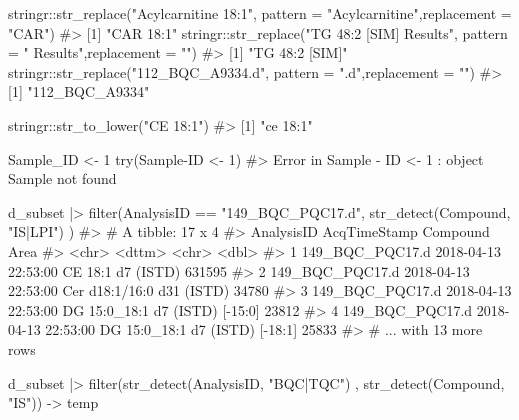 \documentclass[
  letterpaper,
  DIV=11,
  numbers=noendperiod]{scrreprt}
\newenvironment{Shaded}{\begin{snugshade}}{\end{snugshade}}
\newcommand{\AttributeTok}[1]{\textcolor[rgb]{0.40,0.45,0.13}{#1}}
\newcommand{\CommentTok}[1]{\textcolor[rgb]{0.37,0.37,0.37}{#1}}
\newcommand{\DecValTok}[1]{\textcolor[rgb]{0.68,0.00,0.00}{#1}}
\newcommand{\FunctionTok}[1]{\textcolor[rgb]{0.28,0.35,0.67}{#1}}
\newcommand{\NormalTok}[1]{\textcolor[rgb]{0.00,0.23,0.31}{#1}}
\newcommand{\OtherTok}[1]{\textcolor[rgb]{0.00,0.23,0.31}{#1}}
\newcommand{\SpecialCharTok}[1]{\textcolor[rgb]{0.37,0.37,0.37}{#1}}
\newcommand{\StringTok}[1]{\textcolor[rgb]{0.13,0.47,0.30}{#1}}
\begin{document}
\begin{Shaded}
\begin{Highlighting}[]
\NormalTok{stringr}\SpecialCharTok{::}\FunctionTok{str\_replace}\NormalTok{(}\StringTok{"Acylcarnitine 18:1"}\NormalTok{, }\AttributeTok{pattern =} \StringTok{"Acylcarnitine"}\NormalTok{,}\AttributeTok{replacement =} \StringTok{"CAR"}\NormalTok{)}
\CommentTok{\#\textgreater{} [1] "CAR 18:1"}
\NormalTok{stringr}\SpecialCharTok{::}\FunctionTok{str\_replace}\NormalTok{(}\StringTok{"TG 48:2 [SIM] Results"}\NormalTok{, }\AttributeTok{pattern =} \StringTok{" Results"}\NormalTok{,}\AttributeTok{replacement =} \StringTok{""}\NormalTok{)}
\CommentTok{\#\textgreater{} [1] "TG 48:2 [SIM]"}
\NormalTok{stringr}\SpecialCharTok{::}\FunctionTok{str\_replace}\NormalTok{(}\StringTok{"112\_BQC\_A9334.d"}\NormalTok{, }\AttributeTok{pattern =} \StringTok{".d"}\NormalTok{,}\AttributeTok{replacement =} \StringTok{""}\NormalTok{)}
\CommentTok{\#\textgreater{} [1] "112\_BQC\_A9334"}

\NormalTok{stringr}\SpecialCharTok{::}\FunctionTok{str\_to\_lower}\NormalTok{(}\StringTok{"CE 18:1"}\NormalTok{)}
\CommentTok{\#\textgreater{} [1] "ce 18:1"}

\NormalTok{Sample\_ID }\OtherTok{\textless{}{-}} \DecValTok{1}
\FunctionTok{try}\NormalTok{(Sample}\SpecialCharTok{{-}}\NormalTok{ID }\OtherTok{\textless{}{-}} \DecValTok{1}\NormalTok{)}
\CommentTok{\#\textgreater{} Error in Sample {-} ID \textless{}{-} 1 : object \textquotesingle{}Sample\textquotesingle{} not found}

\NormalTok{d\_subset }\SpecialCharTok{|\textgreater{}} \FunctionTok{filter}\NormalTok{(AnalysisID }\SpecialCharTok{==} \StringTok{"149\_BQC\_PQC17.d"}\NormalTok{, }\FunctionTok{str\_detect}\NormalTok{(Compound, }\StringTok{"IS|LPI"}\NormalTok{) )}
\CommentTok{\#\textgreater{} \# A tibble: 17 x 4}
\CommentTok{\#\textgreater{}   AnalysisID      AcqTimeStamp        Compound                         Area}
\CommentTok{\#\textgreater{}   \textless{}chr\textgreater{}           \textless{}dttm\textgreater{}              \textless{}chr\textgreater{}                           \textless{}dbl\textgreater{}}
\CommentTok{\#\textgreater{} 1 149\_BQC\_PQC17.d 2018{-}04{-}13 22:53:00 CE 18:1 d7 (ISTD)              631595}
\CommentTok{\#\textgreater{} 2 149\_BQC\_PQC17.d 2018{-}04{-}13 22:53:00 Cer d18:1/16:0 d31 (ISTD)       34780}
\CommentTok{\#\textgreater{} 3 149\_BQC\_PQC17.d 2018{-}04{-}13 22:53:00 DG 15:0\_18:1 d7 (ISTD) [{-}15:0]  23812}
\CommentTok{\#\textgreater{} 4 149\_BQC\_PQC17.d 2018{-}04{-}13 22:53:00 DG 15:0\_18:1 d7 (ISTD) [{-}18:1]  25833}
\CommentTok{\#\textgreater{} \# ... with 13 more rows}

\NormalTok{d\_subset }\SpecialCharTok{|\textgreater{}} \FunctionTok{filter}\NormalTok{(}\FunctionTok{str\_detect}\NormalTok{(AnalysisID, }\StringTok{"BQC|TQC"}\NormalTok{) , }\FunctionTok{str\_detect}\NormalTok{(Compound, }\StringTok{"IS"}\NormalTok{)) }\OtherTok{{-}\textgreater{}}\NormalTok{ temp}
\end{Highlighting}
\end{Shaded}
\end{document}
